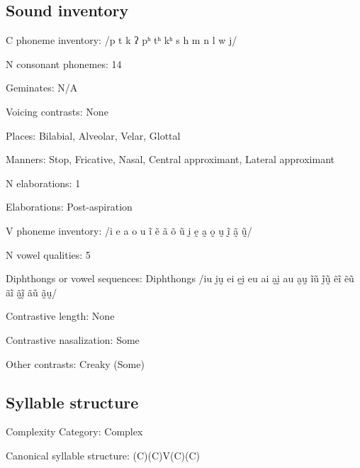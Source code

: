 {\subsection*{Sound inventory}
\begin{appendixdesc}

\item[C phoneme inventory:] /p t k ʔ pʰ tʰ kʰ s h m n l w j/

\item[N consonant phonemes:] 14

\item[Geminates:] N/A

\item[Voicing contrasts:] None

\item[Places:] Bilabial, Alveolar, Velar, Glottal

\item[Manners:] Stop, Fricative, Nasal, Central approximant, Lateral approximant

\item[N elaborations:] 1

\item[Elaborations:] Post-aspiration

\item[V phoneme inventory:] /i e a o u ĩ ẽ ã õ ũ ḭ ḛ a̰ o̰ ṵ ḭ̃ ã̰ ṵ̃/

\item[N vowel qualities:] 5

\item[Diphthongs or vowel sequences:] Diphthongs /iu ḭṵ ei ḛḭ eu ai a̰ḭ au a̰ṵ ĩũ ḭ̃ṵ̃ ẽĩ ẽũ ãĩ ã̰ḭ̃ ãũ ã̰ṵ/

\item[Contrastive length:] None

\item[Contrastive nasalization:] Some

\item[Other contrasts:] Creaky (Some)
\end{appendixdesc}
\subsection*{Syllable structure}
\begin{appendixdesc}

\item[Complexity Category:] Complex

\item[Canonical syllable structure:] (C)(C)V(C)(C) \citep[124--134]{Eberhard2009}


\end{appendixdesc}}
